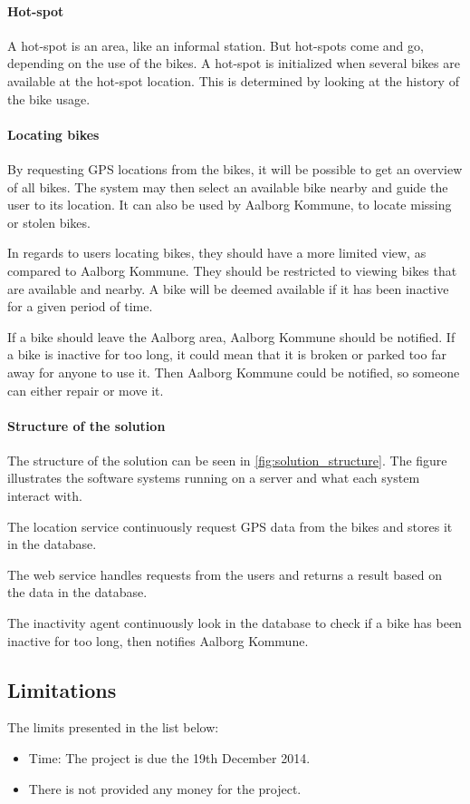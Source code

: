\paragraph{Hot-spot}
A hot-spot is an area, like an informal station.
But hot-spots come and go, depending on the use of the bikes.
A hot-spot is initialized when several bikes are available at the hot-spot location.
This is determined by looking at the history of the bike usage.

\paragraph{Locating bikes}
By requesting GPS locations from the bikes, it will be possible to get an overview of all bikes.
The system may then select an available bike nearby and guide the user to its location.
It can also be used by Aalborg Kommune, to locate missing or stolen bikes.

In regards to users locating bikes, they should have a more limited view, as compared to Aalborg Kommune.
They should be restricted to viewing bikes that are available and nearby.
A bike will be deemed available if it has been inactive for a given period of time.

If a bike should leave the Aalborg area, Aalborg Kommune should be notified.
If a bike is inactive for too long, it could mean that it is broken or parked too far away for anyone to use it.
Then Aalborg Kommune could be notified, so someone can either repair or move it.

\paragraph{Structure of the solution}
The structure of the solution can be seen in \cref{fig:solution_structure}.
The figure illustrates the software systems running on a server and what each system interact with.

The location service continuously request GPS data from the bikes and stores it in the database.

The web service handles requests from the users and returns a result based on the data in the database.

The inactivity agent continuously look in the database to check if a bike has been inactive for too long, then notifies Aalborg Kommune.

\subsection{Limitations}
The limits presented in the list below:
\begin{itemize}
\item Time: The project is due the 19th December 2014.
\item There is not provided any money for the project.
\end{itemize}


